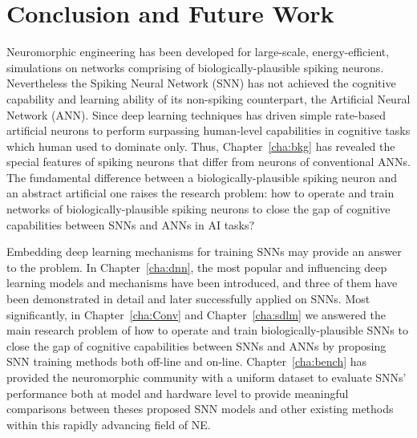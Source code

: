 \chapter{Conclusion and Future Work}
\label{cha:conc}
Neuromorphic engineering has been developed for large-scale, energy-efficient, simulations on networks comprising of biologically-plausible spiking neurons.
Nevertheless the Spiking Neural Network (SNN) has not achieved the cognitive capability and learning ability of its non-spiking counterpart, the Artificial Neural Network (ANN).
Since deep learning techniques has driven simple rate-based artificial neurons to perform surpassing human-level capabilities in cognitive tasks which human used to dominate only. 
Thus, Chapter~\ref{cha:bkg} has revealed the special features of spiking neurons that differ from neurons of conventional ANNs.
The fundamental difference between a biologically-plausible spiking neuron and an abstract artificial one raises the research problem: how to operate and train networks of biologically-plausible spiking neurons to close the gap of cognitive capabilities between SNNs and ANNs in AI tasks?

Embedding deep learning mechanisms for training SNNs may provide an answer to the problem.
In Chapter~\ref{cha:dnn}, the most popular and influencing deep learning models and mechanisms have been introduced, and three of them have been demonstrated in detail and later successfully applied on SNNs.
Most significantly, in Chapter~\ref{cha:Conv} and Chapter~\ref{cha:sdlm} we answered the main research problem of how to operate and train biologically-plausible SNNs to close the gap of cognitive capabilities between SNNs and ANNs by proposing SNN training methods both off-line and on-line.
Chapter~\ref{cha:bench} has provided the neuromorphic community with a uniform dataset to evaluate SNNs' performance both at model and hardware level to provide meaningful comparisons between theses proposed SNN models and other existing methods within this rapidly advancing field of NE.%

